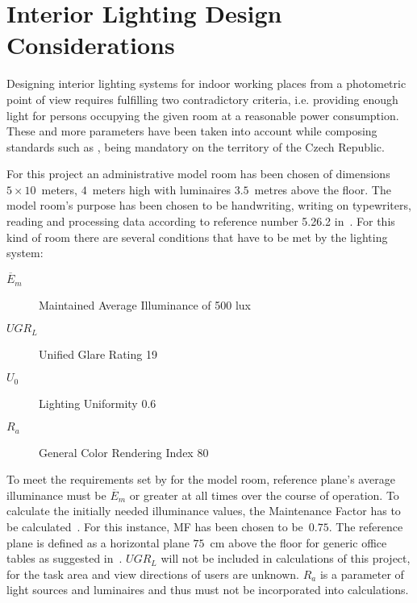 \section{Interior Lighting Design Considerations} \label{sec:design}
Designing interior lighting systems for indoor working places from a photometric point of view requires fulfilling two contradictory criteria, i.e. providing enough light for persons occupying the given room at a reasonable power consumption. These and more parameters have been taken into account while composing standards such as \cite{12464}, being mandatory on the territory of the Czech Republic.

For this project an administrative model room has been chosen of dimensions $5 \times 10 $~meters, $4$~meters high with luminaires $3.5$~metres above the floor. The model room's purpose has been chosen to be handwriting, writing on typewriters, reading and processing data according to reference number 5.26.2 in~\cite{12464}. For this kind of room there are several conditions that have to be met by the lighting system:

\begin{description}
	\item[$\overline{E}_{m}$] Maintained Average Illuminance of 500 lux
	\item[$UGR_{L}$] Unified Glare Rating 19
	\item[$U_{0}$] Lighting Uniformity 0.6
	\item[$R_{a}$] General Color Rendering Index 80
\end{description}

To meet the requirements set by \cite{12464} for the model room, reference plane's average illuminance must be $\overline{E}_{m}$ or greater at all times over the course of operation. To calculate the initially needed illuminance values, the Maintenance Factor has to be calculated~\cite{CIE97}. For this instance, MF has been chosen to be~$0.75$. The reference plane is defined as a horizontal plane $75$~cm above the floor for generic office tables as suggested in~\cite{12464}. $UGR_{L}$ will not be included in calculations of this project, for the task area and view directions of users are unknown. $R_{a}$ is a parameter of light sources and luminaires and thus must not be incorporated into calculations.